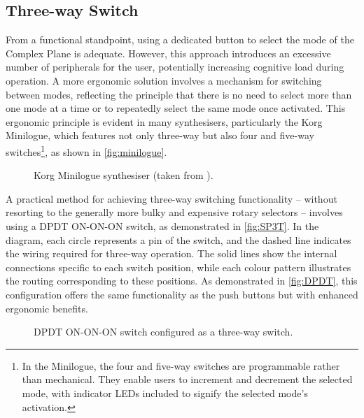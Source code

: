 \documentclass[12pt]{article}
\numberwithin{subsubsubsection}{subsubsection}
\begin{document}
\subsection{Three-way Switch}

From a functional standpoint, using a dedicated button to select the mode of the Complex Plane is adequate. However, this approach introduces an excessive number of peripherals for the user, potentially increasing cognitive load during operation. A more ergonomic solution involves a mechanism for switching between modes, reflecting the principle that there is no need to select more than one mode at a time or to repeatedly select the same mode once activated. This ergonomic principle is evident in many synthesisers, particularly the Korg Minilogue, which features not only three-way but also four and five-way switches\footnote{In the Minilogue, the four and five-way switches are programmable rather than mechanical. They enable users to increment and decrement the selected mode, with indicator LEDs included to signify the selected mode's activation.}, as shown in \autoref{fig:minilogue}.

\begin{figure}[H]
    \centering
    \caption{Korg Minilogue synthesiser (taken from \cite{minilogue}).}
    \label{fig:minilogue}
\end{figure}


A practical method for achieving three-way switching functionality – without resorting to the generally more bulky and expensive rotary selectors – involves using a DPDT ON-ON-ON switch, as demonstrated in \autoref{fig:SP3T}. In the diagram, each circle represents a pin of the switch, and the dashed line indicates the wiring required for three-way operation. The solid lines show the internal connections specific to each switch position, while each colour pattern illustrates the routing corresponding to these positions. As demonstrated in \autoref{fig:DPDT}, this configuration offers the same functionality as the push buttons but with enhanced ergonomic benefits.


\begin{figure}[H]
    \centering
    \caption{DPDT ON-ON-ON switch configured as a three-way switch.}
    \label{fig:SP3T}
\end{figure}
\end{document}
